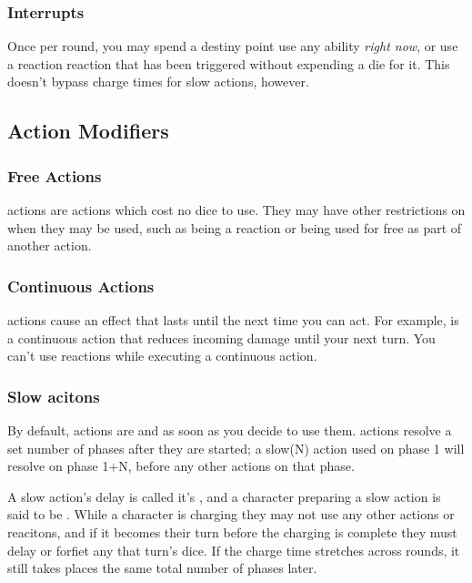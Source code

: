 \begin{multicols}{2}
        \subsubsection{Interrupts}
            Once per round, you may spend a destiny point use any ability \textit{right now}, or use a reaction reaction that has been triggered without expending a die for it. This doesn't bypass charge times for slow actions, however.

    \subsection{Action Modifiers}
        \subsubsection{Free Actions}
             actions are actions which cost no dice to use. They may have other restrictions on when they may be used, such as being a reaction or being used for free as part of another action.

        \subsubsection{Continuous Actions}
             actions cause an effect that lasts until the next time you can act. For example,  is a continuous action that reduces incoming damage until your next turn. You can't use reactions while executing a continuous action.

        \subsubsection{Slow acitons}
            By default, actions are  and  as soon as you decide to use them.  actions resolve a set number of phases after they are started; a slow(N) action used on phase 1 will resolve on phase 1+N, before any other actions on that phase.
            
            A slow action's delay is called it's , and a character preparing a slow action is said to be . While a character is charging they may not use any other actions or reacitons, and if it becomes their turn before the charging is complete they must delay or forfiet any that turn's dice. If the charge time stretches across rounds, it still takes places the same total number of phases later.


\end{multicols}
